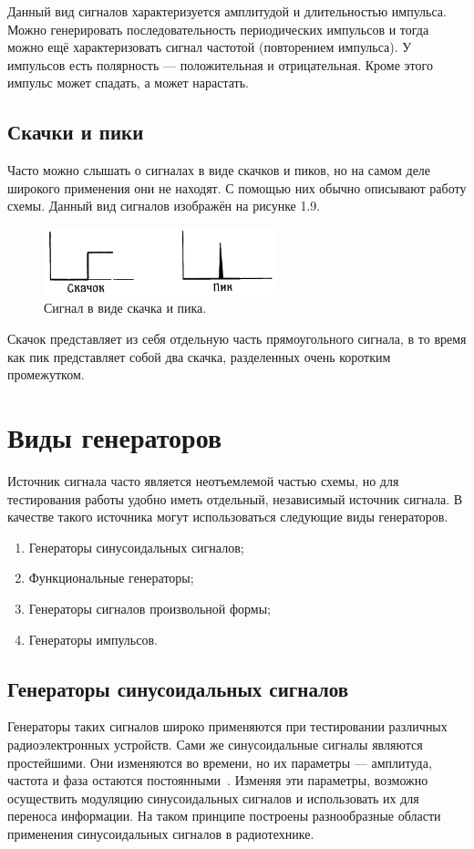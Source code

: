 	Данный вид сигналов характеризуется амплитудой и длительностью импульса. Можно генерировать последовательность периодических импульсов и тогда можно ещё характеризовать сигнал частотой (повторением импульса). У импульсов есть полярность --- положительная и отрицательная. Кроме этого импульс может спадать, а может нарастать. 
	


\subsection{Скачки и пики}
	Часто можно слышать о сигналах в виде скачков и пиков, но на самом деле широкого применения они не находят. С помощью них обычно описывают работу схемы. Данный вид сигналов изображён на рисунке 1.9.

	\begin{figure}[H]
    \centering
    \includegraphics[width=0.6\textwidth]{../image/s_sp.png}
    \caption{Сигнал в виде скачка и пика.}
	\end{figure}

	Скачок представляет из себя отдельную часть прямоугольного сигнала, в то время как пик представляет собой два скачка, разделенных очень коротким промежутком.


\section{Виды генераторов}
	Источник сигнала часто является неотъемлемой частью схемы, но для тестирования работы удобно иметь отдельный, независимый источник сигнала. В качестве такого источника могут использоваться следующие виды генераторов.
\begin{enumerate}
	\item Генераторы синусоидальных сигналов;
	\item Функциональные генераторы;
	\item Генераторы сигналов произвольной формы;
	\item Генераторы импульсов.
\end{enumerate}

\subsection{Генераторы синусоидальных сигналов}
	Генераторы таких сигналов широко применяются при тестировании различных радиоэлектронных устройств. Сами же синусоидальные сигналы являются простейшими. Они изменяются во времени, но их параметры --- амплитуда, частота и фаза остаются постоянными~\cite{dgs}. Изменяя эти параметры, возможно осуществить модуляцию синусоидальных сигналов и использовать их для переноса информации. На таком принципе построены разнообразные области применения синусоидальных сигналов в радиотехнике.


